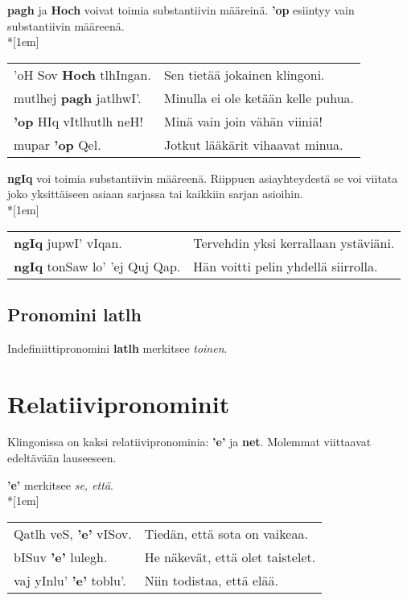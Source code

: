 \documentclass{book}
\begin{document}
\textbf{pagh} ja \textbf{Hoch} voivat toimia substantiivin määreinä. \textbf{'op} esiintyy vain substantiivin määreenä.\\*[1em]
\begin{tabular}{l l}
    'oH Sov \textbf{Hoch} tlhIngan. & Sen tietää jokainen klingoni. \\
    mutlhej \textbf{pagh} jatlhwI'. & Minulla ei ole ketään kelle puhua. \\
    \textbf{'op} HIq vItlhutlh neH! & Minä vain join vähän viiniä! \\
    mupar \textbf{'op} Qel. & Jotkut lääkärit vihaavat minua. \\
\end{tabular}

\textbf{ngIq} voi toimia substantiivin määreenä. Riippuen asiayhteydestä se voi viitata joko yksittäiseen asiaan sarjassa tai kaikkiin sarjan asioihin.\\*[1em]
\begin{tabular}{l l}
    \textbf{ngIq} jupwI' vIqan. & Tervehdin yksi kerrallaan ystäviäni. \\
    \textbf{ngIq} tonSaw lo' 'ej Quj Qap. & Hän voitti pelin yhdellä siirrolla. \\
\end{tabular}

\subsection{Pronomini latlh}

Indefiniittipronomini \textbf{latlh} merkitsee \textit{toinen}.

\section{Relatiivipronominit}

Klingonissa on kaksi relatiivipronominia: \textbf{'e'} ja \textbf{net}.
Molemmat viittaavat edeltävään lauseeseen.

\textbf{'e'} merkitsee \textit{se, että}.\\*[1em]
\begin{tabular}{l l}
    Qatlh veS, \textbf{'e'} vISov. & Tiedän, että sota on vaikeaa. \\
    bISuv \textbf{'e'} lulegh. & He näkevät, että olet taistelet. \\
    vaj yInlu' \textbf{'e'} toblu'. & Niin todistaa, että elää. \\
\end{tabular}
\end{document}
